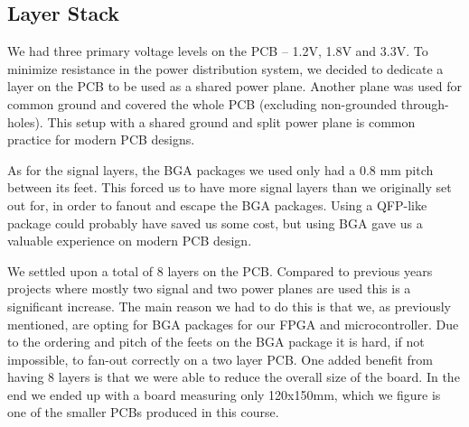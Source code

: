 \subsection{Layer Stack}

We had three primary voltage levels on the PCB -- 1.2V, 1.8V and 3.3V. To
minimize resistance in the power distribution system, we decided to dedicate a
layer on the PCB to be used as a shared power plane. Another plane was used for
common ground and covered the whole PCB (excluding non-grounded through-holes).
This setup with a shared ground and split power plane is common practice for
modern PCB designs.

As for the signal layers, the BGA packages we used only had a 0.8 mm pitch between
its feet. This forced us to have more signal layers than we originally set out
for, in order to fanout and escape the BGA packages. Using a QFP-like package
could probably have saved us some cost, but using BGA gave us a valuable
experience on modern PCB design.

We settled upon a total of 8 layers on the PCB. Compared to previous years projects
where mostly two signal and two power planes are used this is a significant increase.
The main reason we had to do this is that we, as previously mentioned, are opting for
BGA packages for our FPGA and microcontroller. Due to the ordering and pitch of the 
feets on the BGA package it is hard, if not impossible, to fan-out correctly on a 
two layer PCB. One added benefit from having 8 layers is that we were able to reduce
the overall size of the board. In the end we ended up with a board measuring only
120x150mm, which we figure is one of the smaller PCBs produced in this course.
